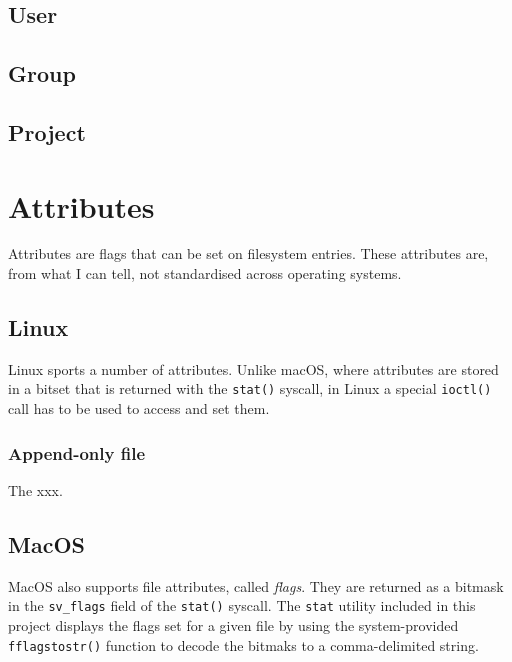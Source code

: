 \documentclass[a4paper]{article}
\begin{document}
\subsection{User}

\subsection{Group}

\subsection{Project}


\section{Attributes}

Attributes are flags that can be set on filesystem entries. These attributes are, from what I can tell, not standardised across operating systems. 

\subsection{Linux}

Linux sports a number of attributes. Unlike macOS, where attributes are stored in a bitset that is returned with the \verb|stat()| syscall, in Linux a special \verb|ioctl()| call has to be used to access and set them.


\subsubsection{Append-only file}

The xxx.

\subsection{MacOS}



MacOS also supports file attributes, called \emph{flags}. They are returned as a bitmask in the \verb|sv_flags| field of the \verb|stat()| syscall. The \verb|stat| utility included in this project displays the flags set for a given file by using the system-provided \verb|fflagstostr()| function to decode the bitmaks to a comma-delimited string.
\end{document}
